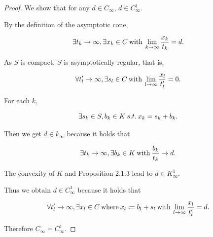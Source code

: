 \documentclass[a4paper,11pt]{jsarticle}
\begin{document}
\begin{proof}
  We show that for any $d \in C_{\infty}$, $d \in C_{\infty}^1$.

  By the definition of the asymptotic cone,

  \begin{equation}
    \exists t_k \rightarrow \infty, \exists x_k \in C \:\text{with}\: \lim_{k \to \infty} \frac{x_k}{t_k} = d. \notag
  \end{equation}

  As $S$ is compact, $S$ is asymptotically regular, that is,

  \begin{equation}
    \forall t'_l \rightarrow \infty, \exists s_l \in C \:\text{with}\: \lim_{l \to \infty} \frac{x_l}{t'_l} = 0. \notag
  \end{equation}

  For each $k$,

  \begin{equation}
    \exists s_k \in S, b_k \in K \:s.t.\: x_k = s_k + b_k. \notag
  \end{equation}

  Then we get $d \in k_{\infty}$ because it holds that

  \begin{equation}
    \exists t_k \rightarrow \infty, \exists b_k \in K \:\text{with}\: \frac{b_k}{t_k} \rightarrow d. \notag
  \end{equation}

  The convexity of $K$ and Proposition 2.1.3 lead to $d \in K_{\infty}^1$.

  Thus we obtain $d \in C_{\infty}^1$ because it holds that

  \begin{equation}
    \forall t'_l \rightarrow \infty, \exists x_l \in C \:\text{where}\: x_l \coloneqq b_l + s_l \:\text{with}\: \lim_{l \to \infty} \frac{x_l}{t'_l} = d. \notag
  \end{equation}

  Therefore $C_{\infty} = C_{\infty}^1$.

\end{proof}
\end{document}
